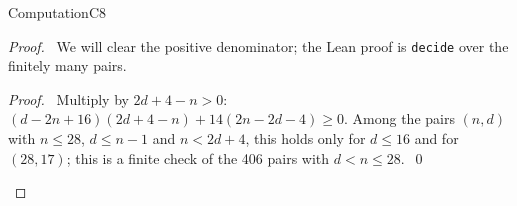 \begin{namedresult}{Computation}{C8}\label{comp:C8}
 \uses{}
\end{namedresult}
\begin{proof}
 \pfsketch\ We will clear the positive denominator; the Lean proof is \texttt{decide} over the
 finitely many pairs.
 \qedstep
 \begin{proof}\pf\ Multiply by $2d+4-n>0$:
  $(d-2n+16)(2d+4-n)+14(2n-2d-4)\ge0$. Among the pairs $(n,d)$ with $n\le28$, $d\le n-1$ and
  $n<2d+4$, this holds only for $d\le16$ and for $(28,17)$; this is a finite check of the 406
  pairs with $d<n\le28$.~\qed\end{proof}
\end{proof}

